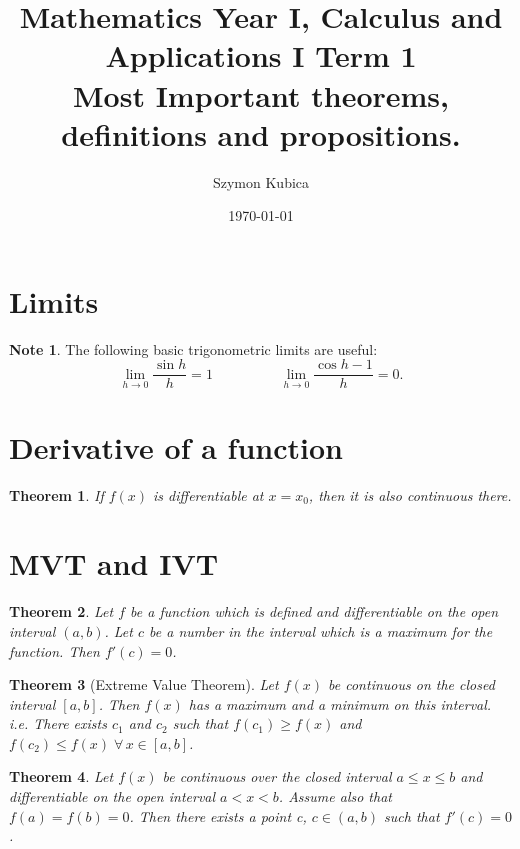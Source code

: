 \documentclass[11pt,a4paper]{article}
\newtheorem{theorem}{Theorem}
\theoremstyle{definition}
\newtheorem{note}{Note}
\begin{document}
\title{Mathematics Year I, Calculus and Applications I Term 1 \\ Most Important theorems, definitions and propositions. } 
\date{\today}
\author{Szymon Kubica} 
\maketitle

\section{Limits}
\begin{note}
    The following basic trigonometric limits are useful:
    \[\lim_{h \to 0 } \frac{\sin h}{h} = 1 \hspace{2cm} \lim_{h \to 0 } \frac{\cos h - 1}{h} = 0.\]
\end{note}

\section{Derivative of a function}

\begin{theorem}
    If $ f(x) $ is differentiable at $ x = x_0 $, then it is also continuous there.
\end{theorem}

\section{MVT and IVT}

\begin{theorem}
    Let $ f $ be a function which is defined and differentiable on the open interval $ (a, b) $. Let $ c $ be a number in the interval which is a maximum for the function. Then $ f'(c) = 0 $.  
\end{theorem}

\begin{theorem}[Extreme Value Theorem]
    Let $ f(x) $ be continuous on the closed interval $ [a, b] $. Then $ f(x) $ has a maximum and a minimum on this interval. i.e. There exists $ c_1 $ and $ c_2 $ such that $ f(c_1) \geq f(x) $
    and $ f(c_2) \leq f(x) \; \forall \, x \in [a, b] $.
\end{theorem}

\begin{theorem}
    Let $ f(x) $ be continuous over the closed interval $ a \leq x \leq b $ and differentiable on the open interval $ a < x < b $. Assume also that $ f(a) = f(b) = 0 $.
    Then there exists a point c, $ c \in (a, b) $ such that  $ f'(c) = 0 $.
\end{theorem}
\end{document}
